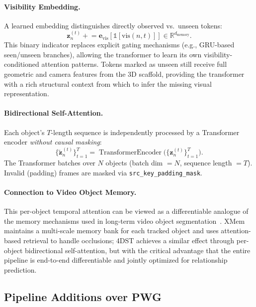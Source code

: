 \documentclass[runningheads]{llncs}
\newcommand{\mR}{\mathbb{R}}
\newcommand{\op}[1]{\operatorname{#1}}
\newcommand{\mat}[1]{\bm{#1}}
\begin{document}
\paragraph{Visibility Embedding.}  A learned embedding distinguishes directly observed vs.\ unseen tokens:
\begin{equation}
    \mat{z}_n^{(t)} \mathrel{+}= \mat{e}_{\text{vis}}[\mathbb{1}[\text{vis}(n, t)]] \in \mR^{d_{\text{memory}}}.
    \label{eq:vis_emb}
\end{equation}
This binary indicator replaces explicit gating mechanisms (e.g., GRU-based seen/unseen branches), allowing the transformer to learn its own visibility-conditioned attention patterns.  Tokens marked as unseen still receive full geometric and camera features from the 3D scaffold, providing the transformer with a rich structural context from which to infer the missing visual representation.

\paragraph{Bidirectional Self-Attention.}  Each object's $T$-length sequence is independently processed by a Transformer encoder \emph{without causal masking}:
\begin{equation}
    \{\tilde{\mat{z}}_n^{(t)}\}_{t=1}^{T} = \op{TransformerEncoder}\bigl(\{\mat{z}_n^{(t)}\}_{t=1}^{T}\bigr).
    \label{eq:4dst_biattn}
\end{equation}
The Transformer batches over $N$ objects (batch dim $=N$, sequence length $=T$).  Invalid (padding) frames are masked via \texttt{src\_key\_padding\_mask}.

\paragraph{Connection to Video Object Memory.}  This per-object temporal attention can be viewed as a differentiable analogue of the memory mechanisms used in long-term video object segmentation~\cite{cheng2022xmem,oh2019video}.  XMem~\cite{cheng2022xmem} maintains a multi-scale memory bank for each tracked object and uses attention-based retrieval to handle occlusions; 4DST achieves a similar effect through per-object bidirectional self-attention, but with the critical advantage that the entire pipeline is end-to-end differentiable and jointly optimized for relationship prediction.


\subsection{Pipeline Additions over PWG}
\end{document}
